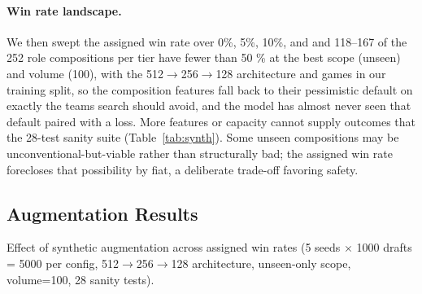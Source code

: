 \documentclass[journal]{IEEEtran}
\providecommand{\DIFaddtex}[1]{{\protect\color{blue} \sf #1}} %
\providecommand{\DIFdeltex}[1]{{\protect\color{red} \scriptsize #1}} %
\providecommand{\DIFaddbegin}{} %
\providecommand{\DIFaddend}{} %
\providecommand{\DIFdelbegin}{} %
\providecommand{\DIFdelend}{} %
\providecommand{\DIFdelFL}[1]{\DIFdel{#1}} %
\providecommand{\DIFadd}[1]{\texorpdfstring{\DIFaddtex{#1}}{#1}} %
\providecommand{\DIFdel}[1]{\texorpdfstring{\DIFdeltex{#1}}{}} %
\begin{document}
\paragraph{\DIFdel{Win rate landscape.}} %
\addtocounter{paragraph}{-1}%
\DIFdel{We then swept the assigned win rate over 0\%, 5\%, 10\%, and }\DIFdelend \DIFaddbegin \DIFadd{and 118--167 of the 252 role compositions per tier have fewer than }\DIFaddend 50 \DIFdelbegin \DIFdel{\% at the best scope (unseen) and volume (100), with the 512$\to$256$\to$128 architecture and }\DIFdelend \DIFaddbegin \DIFadd{games in our training split, so the composition features fall back to their pessimistic default on exactly the teams search should avoid, and the model has almost never seen that default paired with a loss. More features or capacity cannot supply outcomes that }\DIFaddend the \DIFdelbegin \DIFdel{28-test sanity suite (Table~\ref{tab:synth}). Some unseen compositions may be unconventional-but-viable rather than structurally bad; the assigned win rate forecloses that possibility by fiat, a deliberate trade-off favoring safety.
}%

\subsection{\DIFdel{Augmentation Results}}
\addtocounter{subsection}{-1}%

{%
\DIFdelFL{Effect of synthetic augmentation across assigned win rates (5 seeds $\times$ 1000 drafts = 5000 per config, 512$\to$256$\to$128 architecture, unseen-only scope, volume=100, 28 sanity tests).}}
\end{document}
